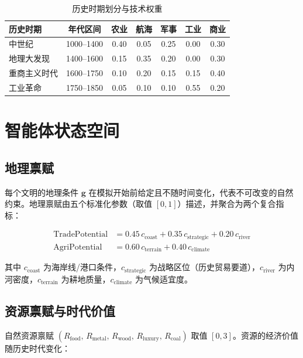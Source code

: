 \documentclass[12pt, a4paper]{article}
\begin{document}
\begin{table}[h]
\centering
\caption{历史时期划分与技术权重}
\label{tab:era}
\begin{tabular}{lcccccc}
\toprule
历史时期 & 年代区间 & 农业 & 航海 & 军事 & 工业 & 商业 \\
\midrule
中世纪         & 1000--1400 & 0.40 & 0.05 & 0.25 & 0.00 & 0.30 \\
地理大发现     & 1400--1600 & 0.15 & 0.35 & 0.20 & 0.00 & 0.30 \\
重商主义时代   & 1600--1750 & 0.10 & 0.20 & 0.15 & 0.15 & 0.40 \\
工业革命       & 1750--1850 & 0.05 & 0.10 & 0.10 & 0.55 & 0.20 \\
\bottomrule
\end{tabular}
\end{table}

\section{智能体状态空间}

\subsection{地理禀赋}

每个文明的地理条件 $\mathbf{g}$ 在模拟开始前给定且不随时间变化，代表不可改变的自然约束。地理禀赋由五个标准化参数（取值 $[0,1]$）描述，并聚合为两个复合指标：

\begin{align}
\text{TradePotential} &= 0.45\,c_{\text{coast}} + 0.35\,c_{\text{strategic}} + 0.20\,c_{\text{river}} \label{eq:trade_potential}\\
\text{AgriPotential}  &= 0.60\,c_{\text{terrain}} + 0.40\,c_{\text{climate}} \label{eq:agri_potential}
\end{align}

其中 $c_{\text{coast}}$ 为海岸线/港口条件，$c_{\text{strategic}}$ 为战略区位（历史贸易要道），$c_{\text{river}}$ 为内河密度，$c_{\text{terrain}}$ 为耕地质量，$c_{\text{climate}}$ 为气候适宜度。

\subsection{资源禀赋与时代价值}

自然资源禀赋 $(R_{\text{food}},\, R_{\text{metal}},\, R_{\text{wood}},\, R_{\text{luxury}},\, R_{\text{coal}})$ 取值 $[0,3]$。资源的经济价值随历史时代变化：
\end{document}
